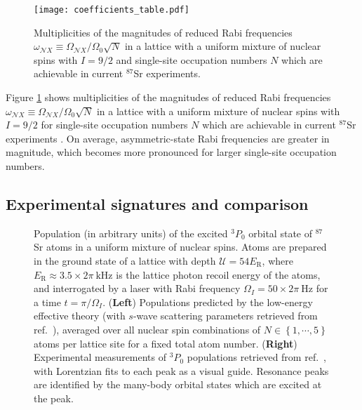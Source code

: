 \documentclass[preprint,showkeys,nofootinbib]{revtex4-1}
\renewcommand{\t}{\text} %
\renewcommand{\set}[1]{\left\{#1\right\}} %
\newcommand{\N}{\mathcal{N}}
\newcommand{\U}{\mathcal{U}}
\newcommand{\1}{\mathds{1}}
\begin{document}
\begin{figure}
  \centering
  \texttt{[image: coefficients\_table.pdf]}
  \caption{\footnotesize Multiplicities of the magnitudes of reduced
    Rabi frequencies
    $\omega_{\N X}\equiv\Omega_{\N X}/\Omega_0\sqrt{N}$ in a lattice
    with a uniform mixture of nuclear spins with $I=9/2$ and
    single-site occupation numbers $N$ which are achievable in current
    ${}^{87}$Sr experiments.}
  \label{fig:coefficients}
\end{figure}

Figure \ref{fig:coefficients} shows multiplicities of the magnitudes
of reduced Rabi frequencies
$\omega_{\N X}\equiv\Omega_{\N X}/\Omega_0\sqrt{N}$ in a lattice with
a uniform mixture of nuclear spins with $I=9/2$ for single-site
occupation numbers $N$ which are achievable in current ${}^{87}$Sr
experiments \cite{goban2018emergence}.  On average, asymmetric-state
Rabi frequencies are greater in magnitude, which becomes more
pronounced for larger single-site occupation numbers.


\subsection{Experimental signatures and comparison}

\begin{figure}
  \centering
  \caption{\footnotesize Population (in arbitrary units) of the
    excited ${}^3P_0$ orbital state of ${}^{87}$Sr atoms in a uniform
    mixture of nuclear spins.  Atoms are prepared in the ground state
    of a lattice with depth $\U=54 E_{\t{R}}$, where
    $E_{\t{R}}\approx3.5\times2\pi~\t{kHz}$ is the lattice photon
    recoil energy of the atoms, and interrogated by a laser with Rabi
    frequency $\Omega_I=50\times2\pi~\t{Hz}$ for a time
    $t=\pi/\Omega_I$.  ({\bf Left}) Populations predicted by the
    low-energy effective theory (with $s$-wave scattering parameters
    retrieved from ref.~\cite{zhang2014spectroscopic}), averaged over
    all nuclear spin combinations of $N\in\set{1,\cdots,5}$ atoms per
    lattice site for a fixed total atom number.  ({\bf Right})
    Experimental measurements of ${}^3P_0$ populations retrieved from
    ref.~\cite{goban2018emergence}, with Lorentzian fits to each peak
    as a visual guide.  Resonance peaks are identified by the
    many-body orbital states which are excited at the peak.}
  \label{fig:sweep}
\end{figure}
\end{document}
